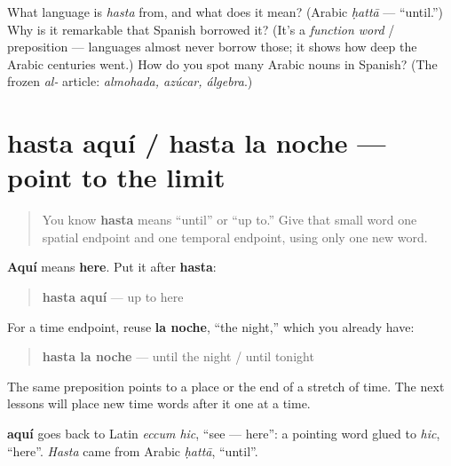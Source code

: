 \begin{tcolorbox}[breakable,colback=teal!4,colframe=teal!35!black,title={Before you move on}]
What language is \emph{hasta} from, and what does it mean? (Arabic \emph{ḥattā} — \textquotedblleft{}until.\textquotedblright{}) Why is it remarkable that Spanish borrowed it? (It's a \emph{function word} / preposition — languages almost never borrow those; it shows how deep the Arabic centuries went.) How do you spot many Arabic nouns in Spanish? (The frozen \emph{al-} article: \emph{almohada, azúcar, álgebra}.)
\end{tcolorbox}
\section[hasta aquí / hasta la noche]{hasta aquí / hasta la noche — point to the limit}

\label{lesson:ES-C05-hasta-limits}



\begin{quote}
You know \textbf{hasta} means “until” or “up to.” Give that small word one spatial endpoint and one temporal endpoint, using only one new word.
\end{quote}

\begin{grammarlens}[title={Grammar Lens: endpoints in space and time}]
\textbf{Aquí} means \textbf{here}. Put it after \textbf{hasta}:

\begin{quote}
\textbf{hasta aquí} — up to here
\end{quote}

For a time endpoint, reuse \textbf{la noche}, “the night,” which you already have:

\begin{quote}
\textbf{hasta la noche} — until the night / until tonight
\end{quote}

The same preposition points to a place or the end of a stretch of time. The next lessons will place new time words after it one at a time.
\end{grammarlens}

\begin{cousinweb}
\textbf{aquí} goes back to Latin \emph{eccum hic}, \textquotedblleft{}see — here\textquotedblright{}: a pointing word glued to \emph{hic}, \textquotedblleft{}here\textquotedblright{}. \emph{Hasta} came from Arabic \emph{ḥattā}, \textquotedblleft{}until\textquotedblright{}.
\end{cousinweb}

